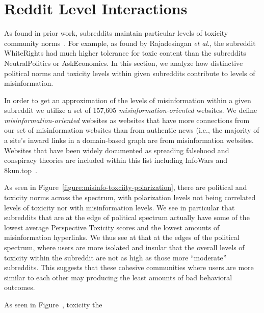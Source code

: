\section{Reddit Level Interactions}
As found in prior work, subreddits maintain particular levels of toxicity community norms~\cite{rajadesingan2020quick}. For example, as found by Rajadesingan \textit{et al.}, the subreddit WhiteRights had much higher tolerance for toxic content than the subreddits NeutralPolitics or AskEconomics. In this section, we analyze how distinctive political norms and toxicity levels within given subreddits contribute to levels of misinformation. 


In order to get an approximation of the levels of misinformation within a given subreddit we utilize a set of 157,605 \textit{misinformation-oriented} websites. We define \textit{misinformation-oriented} websites as websites that have more connections from our set of misinformation websites than from authentic news (i.e., the majority of a site's inward links in a domain-based graph are from misinformation websites. Websites that have been widely documented as spreading falsehood and conspiracy theories are included within this list including InfoWars and 8kun.top~\cite{hanley2022no,starbird2018ecosystem}.


As seen in Figure~\ref{figure:misinfo-toxciity-polarization}, there are political and toxicity norms across the spectrum, with polarization levels not being correlated levels of toxicity nor with misinformation levels. We see in particular that subreddits that are at the edge of political spectrum actually have some of the lowest average Perspective Toxicity scores and the lowest amounts of misinformation hyperlinks. We thus see at that at the edges of the political spectrum, where users are more isolated and insular that the overall levels of toxicity within the subreddit are not as high as those more ``moderate'' subreddits. This suggests that these cohesive communities where users are more similar to each other may producing the least amounts of bad behavioral outcomes. 


As seen in Figure~{}, toxicity the


